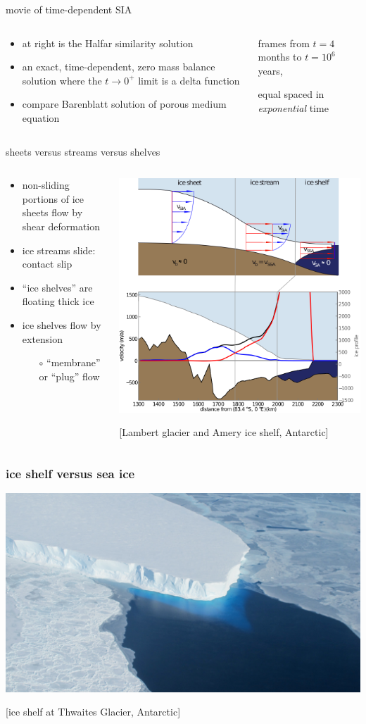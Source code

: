 \documentclass{beamer}
\newcommand{\contactslipslide}{
\begin{frame}{sheets versus streams versus shelves}

\begin{columns}
\begin{column}{0.35\textwidth}
\small
\begin{itemize}
\small
\item non-sliding portions of ice sheets flow by shear deformation
\item ice streams slide: \alert{contact slip}
\item ``ice shelves'' are floating thick ice
\item ice shelves flow by extension
  \begin{itemize}
  \scriptsize
  \item[$\circ$] ``membrane'' or ``plug'' flow
  \end{itemize}
\end{itemize}
\end{column}

\begin{column}{0.65\textwidth}
\includegraphics[width=1.1\textwidth]{siassacartoon-lambert}

\begin{center}
\vspace{-0.18in}
\tiny [Lambert glacier and Amery ice shelf, Antarctic]
\end{center}
\end{column}
\end{columns}
\end{frame}
}
\begin{document}
\begin{frame}{movie of time-dependent SIA}

\begin{columns}
\begin{column}{0.4\textwidth}
\small
\begin{itemize}
\item at right is the Halfar similarity solution
\item an exact, time-dependent, zero mass balance solution where the $t\to 0^+$ limit is a delta function
\item compare Barenblatt solution of porous medium equation
\end{itemize}
\end{column}

\begin{column}{0.65\textwidth}
\vspace{-0.25in}

\begin{center}

\bigskip
\tiny
frames from $t=4$ months to $t = 10^6$ years,

equal spaced in \emph{exponential} time
\end{center}
\end{column}
\end{columns}
\end{frame}


\contactslipslide


\begin{frame}
  \frametitle{ice shelf versus sea ice}

\begin{center}
\vspace{-0.2in}

\includegraphics[width=1.0\textwidth]{supp4rignot-small}

\medskip
\tiny [ice shelf at Thwaites Glacier, Antarctic]
\end{center}
\end{frame}
\end{document}
